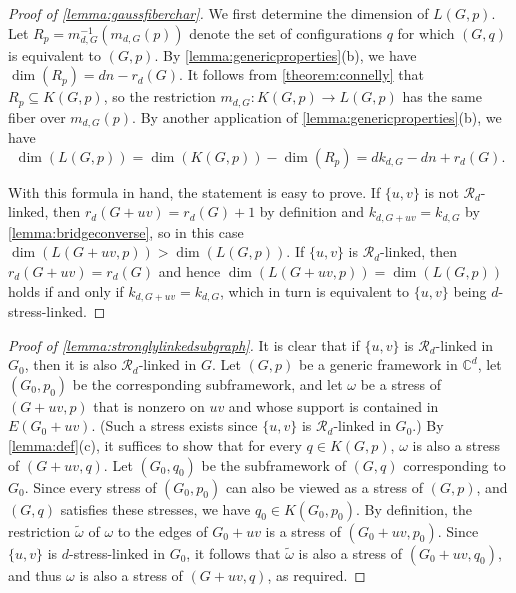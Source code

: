 \documentclass[11pt,a4paper,dvipsnames]{scrartcl}
\theoremstyle{definition}
\newcommand{\CC}{\mathbb{C}}
\newcommand{\stressnullity}[1]{k_{d, #1}}
\newcommand{\strongly}[1]{${#1}$-stress-linked}
\newcommand{\sharedstresskernel}[1]{K}
\begin{document}
\begin{proof}[Proof of \cref{lemma:gaussfiberchar}]
    We first determine the dimension of $L(G,p)$. Let $R_p = m_{d,G}^{-1}(m_{d,G}(p))$ denote the set of configurations $q$ for which $(G,q)$ is equivalent to $(G,p)$. By \cref{lemma:genericproperties}(b), we have $\dim(R_p) = dn - r_d(G)$. It follows from \cref{theorem:connelly} that $R_p \subseteq \sharedstresskernel{d}(G,p)$, so the restriction $m_{d,G} : \sharedstresskernel{d}(G,p) \rightarrow L(G,p)$ has the same fiber over $m_{d,G}(p)$. By another application of \cref{lemma:genericproperties}(b), we have \[\dim(L(G,p)) = \dim(\sharedstresskernel{d}(G,p)) - \dim(R_p) = d\stressnullity{G} - dn + r_d(G).\]
    
    With this formula in hand, the statement is easy to prove. If $\{u,v\}$ is not $\mathcal{R}_d$-linked, then $r_d(G+uv) = r_d(G) + 1$ by definition and $\stressnullity{G+uv} = \stressnullity{G}$ by \cref{lemma:bridgeconverse}, so in this case $\dim(L(G+uv,p)) > \dim(L(G,p))$. If $\{u,v\}$ is $\mathcal{R}_d$-linked, then $r_d(G+uv) = r_d(G)$ and hence $\dim(L(G+uv,p)) = \dim(L(G,p))$ holds if and only if $\stressnullity{G+uv} = \stressnullity{G}$, which in turn is equivalent to $\{u,v\}$ being \strongly{d}.
\end{proof}


\begin{proof}[Proof of \cref{lemma:stronglylinkedsubgraph}]
    It is clear that if $\{u,v\}$ is $\mathcal{R}_d$-linked in $G_0$, then it is also $\mathcal{R}_d$-linked in $G$. Let $(G,p)$ be a generic framework in $\CC^d$, let $(G_0,p_0)$ be the corresponding subframework, and let $\omega$ be a stress of $(G+uv,p)$ that is nonzero on $uv$ and whose support is contained in $E(G_0+uv)$. (Such a stress exists since $\{u,v\}$ is $\mathcal{R}_d$-linked in $G_0$.) By \cref{lemma:def}(c), it suffices to show that for every $q \in \sharedstresskernel{d}(G,p)$, $\omega$ is also a stress of $(G+uv,q)$. Let $(G_0,q_0)$ be the subframework of $(G,q)$ corresponding to $G_0$. Since every stress of $(G_0,p_0)$ can also be viewed as a stress of $(G,p)$, and $(G,q)$ satisfies these stresses, we have $q_0 \in \sharedstresskernel{d}(G_0,p_0)$. By definition, the restriction $\widetilde{\omega}$ of $\omega$ to the edges of $G_0+uv$ is  a stress of $(G_0+uv,p_0)$. Since $\{u,v\}$ is \strongly{d} in $G_0$, it follows that $\widetilde{\omega}$ is also a stress of $(G_0+uv,q_0)$, and thus $\omega$ is also a stress of $(G+uv,q)$, as required.
\end{proof}
\end{document}
